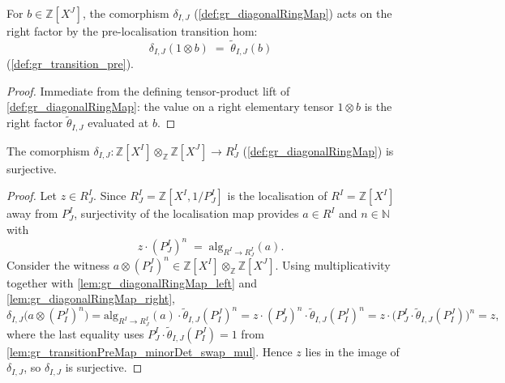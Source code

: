 \begin{lemma}\leanok
  \label{lem:gr_diagonalRingMap_right}
  For \(b \in \mathbb{Z}[X^J]\), the comorphism \(\delta_{I,J}\)
  (\cref{def:gr_diagonalRingMap}) acts on the right factor by the pre-localisation
  transition hom:
  \[
    \delta_{I,J}(1 \otimes b) \;=\; \tilde\theta_{I,J}(b)
  \]
  (\cref{def:gr_transition_pre}).
\end{lemma}
\begin{proof}
  \leanok
  Immediate from the defining tensor-product lift of
  \cref{def:gr_diagonalRingMap}: the value on a right elementary tensor \(1 \otimes
  b\) is the right factor \(\tilde\theta_{I,J}\) evaluated at \(b\).
\end{proof}

\begin{lemma}\leanok
  \label{lem:gr_diagonalRingMap_surjective}
  The comorphism \(\delta_{I,J} : \mathbb{Z}[X^I] \otimes_{\mathbb{Z}}
  \mathbb{Z}[X^J] \to R^I_J\) (\cref{def:gr_diagonalRingMap}) is surjective.
\end{lemma}
\begin{proof}
  \leanok
  Let \(z \in R^I_J\). Since \(R^I_J = \mathbb{Z}[X^I, 1/P^I_J]\) is the
  localisation of \(R^I = \mathbb{Z}[X^I]\) away from \(P^I_J\), surjectivity of
  the localisation map provides \(a \in R^I\) and \(n \in \mathbb{N}\) with
  \[
    z \cdot (P^I_J)^n \;=\; \mathrm{alg}_{R^I \to R^I_J}(a).
  \]
  Consider the witness \(a \otimes (P^J_I)^n \in \mathbb{Z}[X^I]
  \otimes_{\mathbb{Z}} \mathbb{Z}[X^J]\). Using multiplicativity together with
  \cref{lem:gr_diagonalRingMap_left} and \cref{lem:gr_diagonalRingMap_right},
  \[
    \delta_{I,J}\bigl(a \otimes (P^J_I)^n\bigr)
      = \mathrm{alg}_{R^I \to R^I_J}(a) \cdot \tilde\theta_{I,J}(P^J_I)^n
      = z \cdot (P^I_J)^n \cdot \tilde\theta_{I,J}(P^J_I)^n
      = z \cdot \bigl(P^I_J \cdot \tilde\theta_{I,J}(P^J_I)\bigr)^n
      = z,
  \]
  where the last equality uses \(P^I_J \cdot \tilde\theta_{I,J}(P^J_I) = 1\) from
  \cref{lem:gr_transitionPreMap_minorDet_swap_mul}. Hence \(z\) lies in the image
  of \(\delta_{I,J}\), so \(\delta_{I,J}\) is surjective.
\end{proof}

